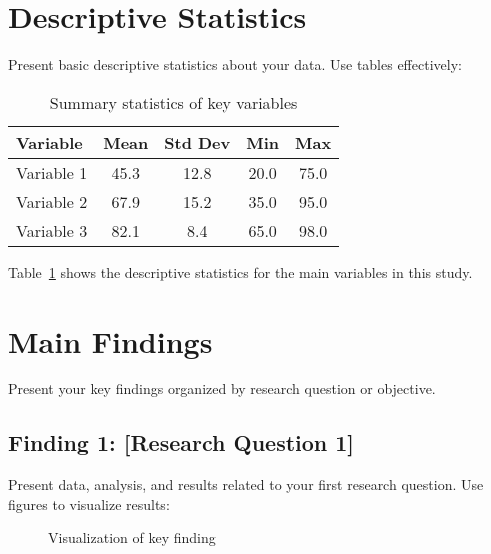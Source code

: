 \documentclass[12pt, a4paper]{report}
\begin{document}
	\section{Descriptive Statistics}
	\label{sec:descriptive}
	
	Present basic descriptive statistics about your data. Use tables effectively:
	
	\begin{table}[h]
		\centering
		\caption{Summary statistics of key variables}
		\label{tab:summary}
		\begin{tabular}{lcccc}
			\toprule
			\textbf{Variable} & \textbf{Mean} & \textbf{Std Dev} & \textbf{Min} & \textbf{Max} \\
			\midrule
			Variable 1 & 45.3 & 12.8 & 20.0 & 75.0 \\
			Variable 2 & 67.9 & 15.2 & 35.0 & 95.0 \\
			Variable 3 & 82.1 & 8.4 & 65.0 & 98.0 \\
			\bottomrule
		\end{tabular}
	\end{table}
	
	Table~\ref{tab:summary} shows the descriptive statistics for the main variables in this study.
	
	\section{Main Findings}
	\label{sec:findings}
	
	Present your key findings organized by research question or objective.
	
	\subsection{Finding 1: [Research Question 1]}
	
	Present data, analysis, and results related to your first research question. Use figures to visualize results:
	
	\begin{figure}[h]
		\centering
		\caption{Visualization of key finding}
		\label{fig:finding1}
	\end{figure}
	
\end{document}

